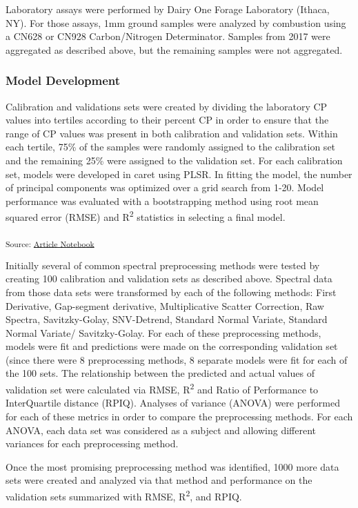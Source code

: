 \documentclass[
]{agujournal2019}
\begin{document}
Laboratory assays were performed by Dairy One Forage Laboratory (Ithaca,
NY). For those assays, 1mm ground samples were analyzed by combustion
using a CN628 or CN928 Carbon/Nitrogen Determinator. Samples from 2017
were aggregated as described above, but the remaining samples were not
aggregated.

\subsubsection{Model Development}\label{model-development}

Calibration and validations sets were created by dividing the laboratory
CP values into tertiles according to their percent CP in order to ensure
that the range of CP values was present in both calibration and
validation sets. Within each tertile, 75\% of the samples were randomly
assigned to the calibration set and the remaining 25\% were assigned to
the validation set. For each calibration set, models were developed in
caret using PLSR. In fitting the model, the number of principal
components was optimized over a grid search from 1-20. Model performance
was evaluated with a bootstrapping method using root mean squared error
(RMSE) and R\textsuperscript{2} statistics in selecting a final model.

\textsubscript{Source:
\href{https://rvcrawford.github.io/glowing-system/index.qmd.html}{Article
Notebook}}

Initially several of common spectral preprocessing methods were tested
by creating 100 calibration and validation sets as described above.
Spectral data from those data sets were transformed by each of the
following methods: First Derivative, Gap-segment derivative,
Multiplicative Scatter Correction, Raw Spectra, Savitzky-Golay,
SNV-Detrend, Standard Normal Variate, Standard Normal Variate/
Savitzky-Golay. For each of these preprocessing methods, models were fit
and predictions were made on the corresponding validation set (since
there were 8 preprocessing methods, 8 separate models were fit for each
of the 100 sets. The relationship between the predicted and actual
values of validation set were calculated via RMSE, R\textsuperscript{2}
and Ratio of Performance to InterQuartile distance (RPIQ). Analyses of
variance (ANOVA) were performed for each of these metrics in order to
compare the preprocessing methods. For each ANOVA, each data set was
considered as a subject and allowing different variances for each
preprocessing method.

Once the most promising preprocessing method was identified, 1000 more
data sets were created and analyzed via that method and performance on
the validation sets summarized with RMSE, R\textsuperscript{2}, and
RPIQ.
\end{document}
